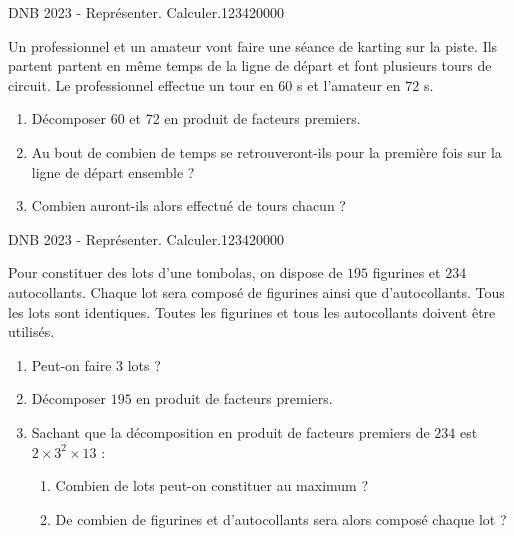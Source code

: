 \begin{pageParcoursd} 
 
\begin{ExoCd}{DNB 2023 - Représenter. Calculer.}{1234}{2}{0}{0}{0}{0}

Un professionnel et un amateur vont faire une séance de karting sur la piste. 
Ils partent partent en même temps de la ligne de départ et font plusieurs tours de circuit.
Le professionnel effectue un tour en $60$ s et l'amateur en $72$ s.

\begin{enumerate}[leftmargin=*]
\item Décomposer 60 et 72 en produit de facteurs premiers.
\item Au bout de combien de temps se retrouveront-ils pour la première fois sur la ligne de départ ensemble ?
\item Combien auront-ils alors effectué de tours chacun ?
\end{enumerate}

\end{ExoCd}



\begin{ExoCd}{DNB 2023 - Représenter. Calculer.}{1234}{2}{0}{0}{0}{0}

Pour constituer des lots d'une tombolas, on dispose de $195$ figurines et $234$ autocollants.
Chaque lot sera composé de figurines ainsi que d'autocollants.
Tous les lots sont identiques.
Toutes les figurines et tous les autocollants doivent être utilisés.

\begin{enumerate}[leftmargin=*]
\item Peut-on faire $3$ lots ? 
\item Décomposer $195$ en produit de facteurs premiers. 
\item Sachant que la décomposition en produit de facteurs premiers de $234$ est $2 \times 3^2 \times 13$ :
\begin{enumerate}[leftmargin=*]
\item Combien de lots peut-on constituer au maximum ? 
\item De combien de figurines et d'autocollants sera alors composé chaque lot ? 
\end{enumerate}
\end{enumerate}
\end{ExoCd}



\end{pageParcoursd}
